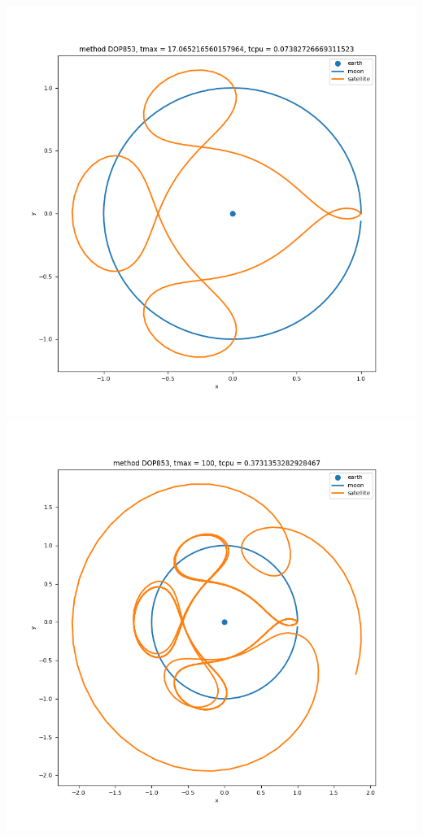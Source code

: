 \documentclass{article}
\begin{document}
\begin{enumerate}
\begin{enumerate}[label=(\alph*)]
\begin{center}
		\includegraphics[scale=.3]{hw2 p1c 3}
		\includegraphics[scale=.3]{hw2 p1c 4}

\end{center}
\end{enumerate}
\end{enumerate}
\end{document}
